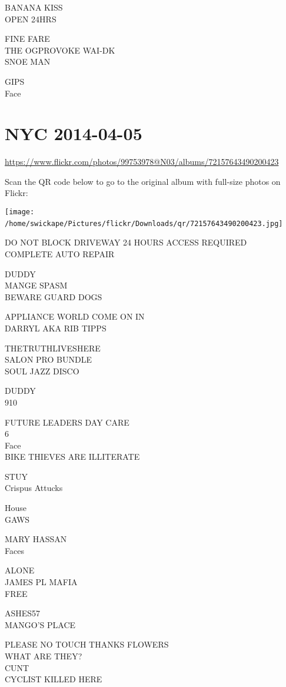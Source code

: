 \documentclass[10pt,letterpaper]{article}
\begin{document}
BANANA KISS\\
OPEN 24HRS

FINE FARE\\
THE OGPROVOKE WAI{-}DK\\
SNOE MAN

GIPS\\
Face
\

\section*{NYC 2014-04-05}

\url{https://www.flickr.com/photos/99753978@N03/albums/72157643490200423}

Scan the QR code below to go to the original album with full-size photos on Flickr:

\texttt{[image: /home/swickape/Pictures/flickr/Downloads/qr/72157643490200423.jpg]}
\

DO NOT BLOCK DRIVEWAY 24 HOURS ACCESS REQUIRED\\
COMPLETE AUTO REPAIR

DUDDY\\
MANGE SPASM\\
BEWARE GUARD DOGS

APPLIANCE WORLD COME ON IN\\
DARRYL AKA RIB TIPPS

THETRUTHLIVESHERE\\
SALON PRO BUNDLE\\
SOUL JAZZ DISCO

DUDDY\\
910

FUTURE LEADERS DAY CARE\\
6\\
Face\\
BIKE THIEVES ARE ILLITERATE

STUY\\
Crispus Attucks

House\\
GAWS

MARY HASSAN\\
Faces

ALONE\\
JAMES PL MAFIA\\
FREE

ASHES57\\
MANGO'S PLACE

PLEASE NO TOUCH THANKS FLOWERS\\
WHAT ARE THEY?\\
CUNT\\
CYCLIST KILLED HERE
\end{document}
